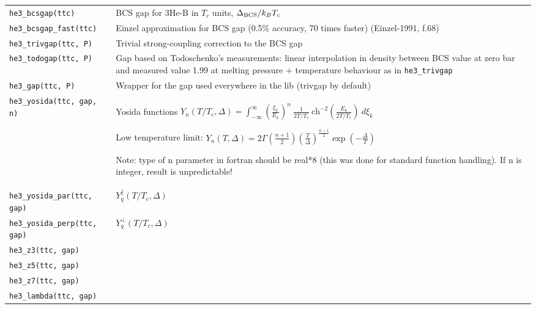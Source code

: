 \documentclass[a4paper]{article}
\begin{document}
\medskip
\noindent\begin{tabular}{lp{11cm}}
\tt he3\_bcsgap(ttc)       & BCS gap for 3He-B in $T_c$ units, $\Delta_{\rm BCS}/ k_B T_c$\\
\tt he3\_bcsgap\_fast(ttc) & Einzel approximation for BCS gap (0.5\% accuracy, 70 times faster)\newline
                             {\small(Einzel-1991, f.68)}\\
\tt he3\_trivgap(ttc, P)   & Trivial strong-coupling correction to the BCS gap\\
\tt he3\_todogap(ttc, P)   & Gap based on Todoschenko's measurements:
                             linear interpolation in density between BCS value at zero bar and
                             measured value 1.99 at melting pressure + temperature behaviour
                             as in {\tt he3\_trivgap}\\
\tt he3\_gap(ttc, P)   &     Wrapper for the gap used everywhere in the lib (trivgap by default)\\

\tt he3\_yosida(ttc, gap, n) & Yosida functions $\displaystyle Y_n(T/T_c,\Delta) =
                               \int_{-\infty}^{\infty} \left(\frac{\xi_k}{E_k}\right)^n
                               \ \frac{1}{2T/T_c}\ \mbox{ch}^{-2}\left(\frac{E_k}{2T/T_c}\right)\ d\xi_k$\par
                               Low temperature limit:
                               $\displaystyle Y_n(T,\Delta) =
                               2\Gamma\left(\frac{n+1}{2}\right)
                               \left(\frac{T}{\Delta}\right)^{\frac{n-1}{2}}
                               \exp\left(-\frac{\Delta}{T}\right)$\par
                               Note: type of n parameter in fortran should be real*8 (this was done
                               for standard function handling). If n is integer, result is unpredictable!\\
\tt he3\_yosida\_par(ttc, gap)  & $Y_q^\parallel(T/T_c,\Delta)$\\
\tt he3\_yosida\_perp(ttc, gap) & $Y_q^\perp(T/T_c,\Delta)$\\

\tt he3\_z3(ttc, gap) &\\
\tt he3\_z5(ttc, gap) &\\
\tt he3\_z7(ttc, gap) &\\
\tt he3\_lambda(ttc, gap) &\\


\end{tabular}
\end{document}
